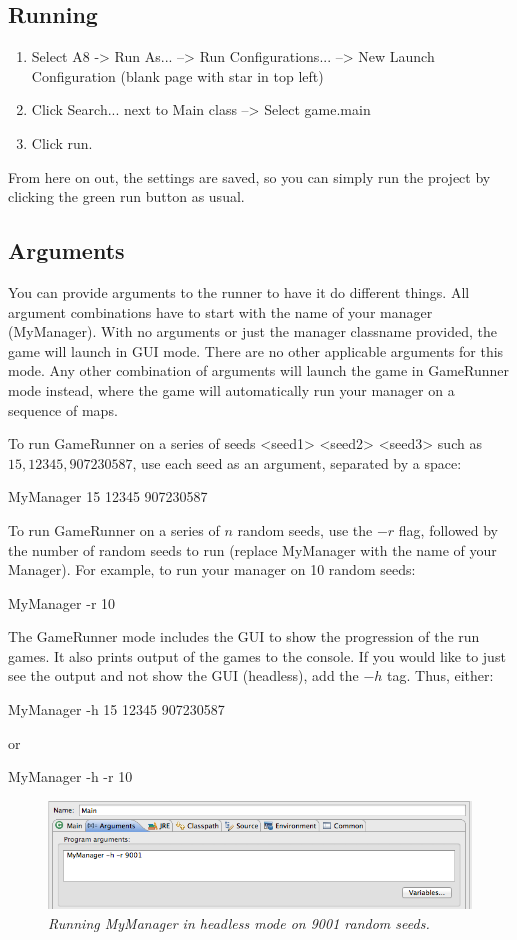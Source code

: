 \documentclass[11pt]{article}
\begin{document}
\subsection{Running}
\begin{enumerate}
\item Select A8 -> Run As... --> Run Configurations... --> New Launch Configuration (blank page with star in top left)
\item Click Search... next to Main class --> Select game.main
\item Click run.
\end{enumerate}

From here on out, the settings are saved, so you can simply run the project by clicking the green run button as usual.

\subsection{Arguments}
You can provide arguments to the runner to have it do different things. All argument combinations have to start with the name of your manager (MyManager). With no arguments or just the manager classname provided, the game will launch in GUI mode. There are no other applicable arguments for this mode. Any other combination of arguments will launch the game in GameRunner mode instead, where the game will automatically run your manager on a sequence of maps. 

To run GameRunner on a series of seeds <seed1> <seed2> <seed3> such as $15, 12345, 907230587$, use each seed as an argument, separated by a space:
\begin{center}
MyManager 15 12345 907230587
\end{center}
To run GameRunner on a series of $n$ random seeds, use the $-r$ flag, followed by the number of random seeds to run (replace MyManager with the name of your Manager). For example, to run your manager on 10 random seeds:
\begin{center}
MyManager -r 10
\end{center}
The GameRunner mode includes the GUI to show the progression of the run games. It also prints output of the games to the console. If you would like to just see the output and not show the GUI (headless), add the $-h$ tag. Thus, either:
\begin{center}
MyManager -h 15 12345 907230587
\end{center}
or
\begin{center}
MyManager -h -r 10
\end{center}
\begin{figure}[h]
\centerline{\includegraphics[scale=0.55]{args.png}} 
\caption{\em{Running MyManager in headless mode on 9001 random seeds.}}
\end{figure}
\end{document}
